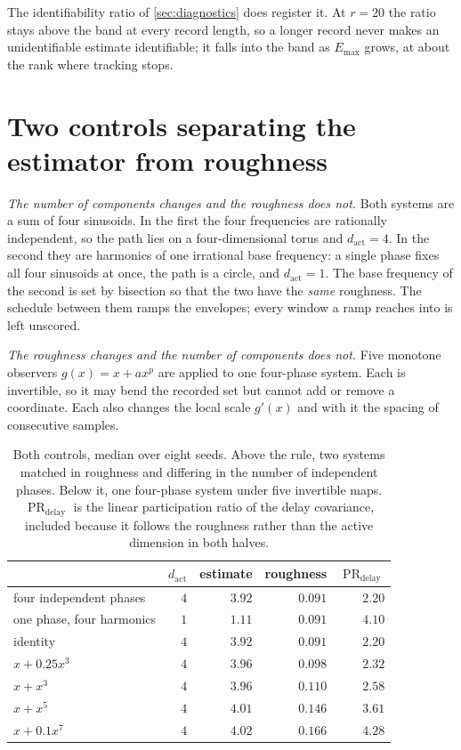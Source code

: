 \documentclass{article}
\DeclareMathOperator{\PR}{PR}
\begin{document}
The identifiability ratio of \cref{sec:diagnostics} does register it. At $r = 20$ the ratio stays
above the band at every record length, so a longer record never makes an unidentifiable estimate
identifiable; it falls into the band as $E_{\max}$ grows, at about the rank where tracking
stops.

\section{Two controls separating the estimator from roughness}\label{app:clocks}

\emph{The number of components changes and the roughness does not.} Both systems are a sum of four sinusoids. In the first the four
frequencies are rationally independent,
so the path lies on a four-dimensional torus and $d_{\mathrm{act}} = 4$. In the second they
are harmonics of one irrational base frequency: a single phase fixes all four sinusoids at
once, the path is a circle, and $d_{\mathrm{act}} = 1$. The base frequency of the second is
set by bisection so that the two have the \emph{same} roughness. The schedule between them
ramps the envelopes; every window a ramp reaches into is left unscored.

\emph{The roughness changes and the number of components does not.} Five monotone observers
$g(x) = x + a x^{p}$ are applied to one four-phase system. Each is invertible, so it may bend the
recorded set but cannot add or remove a coordinate. Each also changes the local scale $g'(x)$ and
with it the spacing of consecutive samples.

\begin{table}[H]
\centering
\caption{Both controls, median over eight seeds. Above the rule, two systems matched in roughness and
differing in the number of independent phases. Below it, one four-phase system under five
invertible maps. $\PR_{\mathrm{delay}}$ is the linear participation ratio of the delay covariance,
included because it follows the roughness rather than the active dimension in both halves.}
\label{tab:clocks}
\begin{tabular}{lrrrr}
\toprule
 & $d_{\mathrm{act}}$ & estimate & roughness & $\PR_{\mathrm{delay}}$ \\
\midrule
four independent phases   & $4$ & $3.92$ & $0.091$ & $2.20$ \\
one phase, four harmonics & $1$ & $1.11$ & $0.091$ & $4.10$ \\
\midrule
identity                & $4$ & $3.92$ & $0.091$ & $2.20$ \\
$x + 0.25x^{3}$         & $4$ & $3.96$ & $0.098$ & $2.32$ \\
$x + x^{3}$             & $4$ & $3.96$ & $0.110$ & $2.58$ \\
$x + x^{5}$             & $4$ & $4.01$ & $0.146$ & $3.61$ \\
$x + 0.1x^{7}$          & $4$ & $4.02$ & $0.166$ & $4.28$ \\
\bottomrule
\end{tabular}
\end{table}
\end{document}
